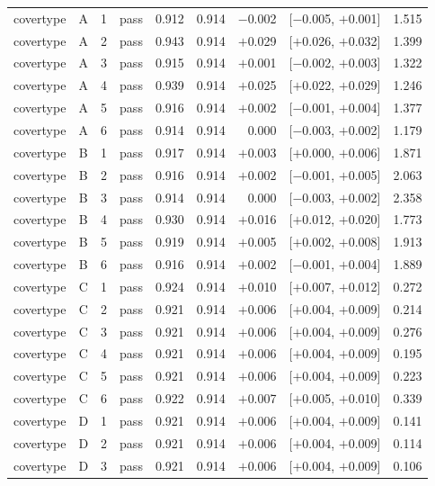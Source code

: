 {\begin{longtable}{lccl rrrcr}
\midrule
covertype & A & 1 & pass & 0.912 & 0.914 & $-$0.002 & [$-$0.005, $+$0.001] & 1.515 \\
covertype & A & 2 & pass & 0.943 & 0.914 & $+$0.029 & [$+$0.026, $+$0.032] & 1.399 \\
covertype & A & 3 & pass & 0.915 & 0.914 & $+$0.001 & [$-$0.002, $+$0.003] & 1.322 \\
covertype & A & 4 & pass & 0.939 & 0.914 & $+$0.025 & [$+$0.022, $+$0.029] & 1.246 \\
covertype & A & 5 & pass & 0.916 & 0.914 & $+$0.002 & [$-$0.001, $+$0.004] & 1.377 \\
covertype & A & 6 & pass & 0.914 & 0.914 & 0.000 & [$-$0.003, $+$0.002] & 1.179 \\
\addlinespace[2pt]
covertype & B & 1 & pass & 0.917 & 0.914 & $+$0.003 & [$+$0.000, $+$0.006] & 1.871 \\
covertype & B & 2 & pass & 0.916 & 0.914 & $+$0.002 & [$-$0.001, $+$0.005] & 2.063 \\
covertype & B & 3 & pass & 0.914 & 0.914 & 0.000 & [$-$0.003, $+$0.002] & 2.358 \\
covertype & B & 4 & pass & 0.930 & 0.914 & $+$0.016 & [$+$0.012, $+$0.020] & 1.773 \\
covertype & B & 5 & pass & 0.919 & 0.914 & $+$0.005 & [$+$0.002, $+$0.008] & 1.913 \\
covertype & B & 6 & pass & 0.916 & 0.914 & $+$0.002 & [$-$0.001, $+$0.004] & 1.889 \\
\addlinespace[2pt]
covertype & C & 1 & pass & 0.924 & 0.914 & $+$0.010 & [$+$0.007, $+$0.012] & 0.272 \\
covertype & C & 2 & pass & 0.921 & 0.914 & $+$0.006 & [$+$0.004, $+$0.009] & 0.214 \\
covertype & C & 3 & pass & 0.921 & 0.914 & $+$0.006 & [$+$0.004, $+$0.009] & 0.276 \\
covertype & C & 4 & pass & 0.921 & 0.914 & $+$0.006 & [$+$0.004, $+$0.009] & 0.195 \\
covertype & C & 5 & pass & 0.921 & 0.914 & $+$0.006 & [$+$0.004, $+$0.009] & 0.223 \\
covertype & C & 6 & pass & 0.922 & 0.914 & $+$0.007 & [$+$0.005, $+$0.010] & 0.339 \\
\addlinespace[2pt]
covertype & D & 1 & pass & 0.921 & 0.914 & $+$0.006 & [$+$0.004, $+$0.009] & 0.141 \\
covertype & D & 2 & pass & 0.921 & 0.914 & $+$0.006 & [$+$0.004, $+$0.009] & 0.114 \\
covertype & D & 3 & pass & 0.921 & 0.914 & $+$0.006 & [$+$0.004, $+$0.009] & 0.106 \\

\end{longtable}}
